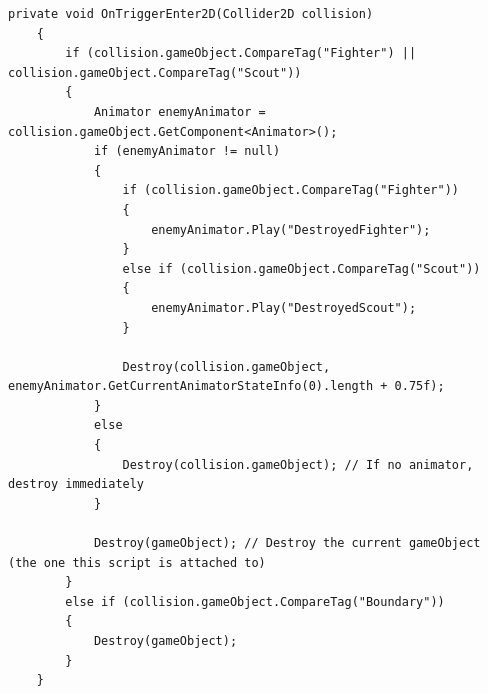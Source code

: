 \begin{lstlisting}[style=csharp]
    private void OnTriggerEnter2D(Collider2D collision)
    {
        if (collision.gameObject.CompareTag("Fighter") || collision.gameObject.CompareTag("Scout"))
        {
            Animator enemyAnimator = collision.gameObject.GetComponent<Animator>();
            if (enemyAnimator != null)
            {
                if (collision.gameObject.CompareTag("Fighter"))
                {
                    enemyAnimator.Play("DestroyedFighter");
                }
                else if (collision.gameObject.CompareTag("Scout"))
                {
                    enemyAnimator.Play("DestroyedScout");
                }
                
                Destroy(collision.gameObject, enemyAnimator.GetCurrentAnimatorStateInfo(0).length + 0.75f);
            }
            else
            {
                Destroy(collision.gameObject); // If no animator, destroy immediately
            }
            
            Destroy(gameObject); // Destroy the current gameObject (the one this script is attached to)
        }
        else if (collision.gameObject.CompareTag("Boundary"))
        {
            Destroy(gameObject);
        }
    }
\end{lstlisting}

